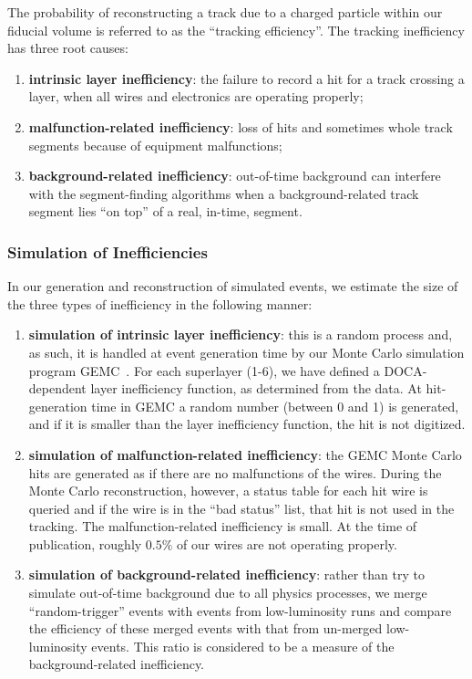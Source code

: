 The probability of reconstructing a track due to a charged particle within our fiducial volume
is referred to as the ``tracking efficiency''. The tracking inefficiency has three root causes:

\begin{enumerate}
\item {\bf intrinsic layer inefficiency}: the failure to record
a hit for a track crossing a layer, when all wires and electronics
are operating properly;
\item {\bf malfunction-related inefficiency}: loss of hits and sometimes
whole track segments because of equipment malfunctions;
\item {\bf background-related inefficiency}: out-of-time background
can interfere with the segment-finding algorithms when a background-related
track segment lies ``on top'' of a real, in-time, segment.
\end{enumerate}

\subsubsection{Simulation of Inefficiencies}

In our generation and reconstruction of simulated events, we estimate the size of
the three types of inefficiency in the following manner:

\begin{enumerate}
\item {\bf simulation of intrinsic layer inefficiency}: this is a random process
and, as such, it is handled at event generation time by our Monte Carlo simulation
program GEMC~\cite{sim-nim}.  For each superlayer (1-6), we have defined a DOCA-dependent
layer inefficiency function, as determined from the data.  At hit-generation
time in GEMC a random number (between 0 and 1) is generated, and if it is
smaller than the layer inefficiency function, the hit is not digitized.
\item {\bf simulation of malfunction-related inefficiency}: the GEMC Monte
Carlo hits are generated as if there are no malfunctions of the wires.
During the Monte Carlo reconstruction, however, a status table for each
hit wire is queried and if the wire is in the ``bad status'' list, that
hit is not used in the tracking.  The malfunction-related inefficiency  is small.  
At the time of publication, roughly $0.5\%$ of our wires are not operating properly.  
\item {\bf simulation of background-related inefficiency}: rather than try
to simulate out-of-time background due to all physics processes, we merge
``random-trigger'' events with events from low-luminosity runs and compare the
efficiency of these merged events with that from un-merged low-luminosity events.
This ratio is considered to be a measure of the background-related inefficiency.
\end{enumerate}

